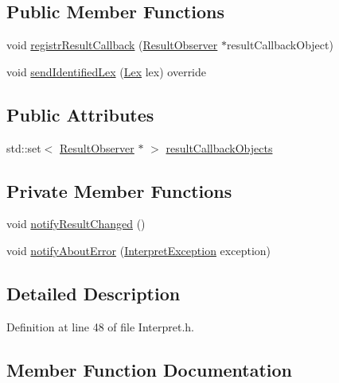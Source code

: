 \subsection*{Public Member Functions}
\begin{DoxyCompactItemize}
\item 
void \hyperlink{classteam22_1_1_calc_1_1_interpret_a23e1e307b4f7ffd42f8eb31d33314c41}{registr\+Result\+Callback} (\hyperlink{classteam22_1_1_calc_1_1_result_observer}{Result\+Observer} $\ast$result\+Callback\+Object)
\item 
void \hyperlink{classteam22_1_1_calc_1_1_interpret_a479c65c010f4ef1060049b684e5f7eb6}{send\+Identified\+Lex} (\hyperlink{classteam22_1_1_calc_1_1_lex}{Lex} lex) override
\end{DoxyCompactItemize}
\subsection*{Public Attributes}
\begin{DoxyCompactItemize}
\item 
std\+::set$<$ \hyperlink{classteam22_1_1_calc_1_1_result_observer}{Result\+Observer} $\ast$ $>$ \hyperlink{classteam22_1_1_calc_1_1_interpret_a7db1e80a4733124ed425e62a90f9eadb}{result\+Callback\+Objects}
\end{DoxyCompactItemize}
\subsection*{Private Member Functions}
\begin{DoxyCompactItemize}
\item 
void \hyperlink{classteam22_1_1_calc_1_1_interpret_af38e3b867c32f50c921027249fc1185a}{notify\+Result\+Changed} ()
\item 
void \hyperlink{classteam22_1_1_calc_1_1_interpret_ab9db5790b1aab8a3f315296853c8e9c6}{notify\+About\+Error} (\hyperlink{class_interpret_exception}{Interpret\+Exception} exception)
\end{DoxyCompactItemize}


\subsection{Detailed Description}


Definition at line 48 of file Interpret.\+h.



\subsection{Member Function Documentation}
\mbox{\label{classteam22_1_1_calc_1_1_interpret_ab9db5790b1aab8a3f315296853c8e9c6}} 
